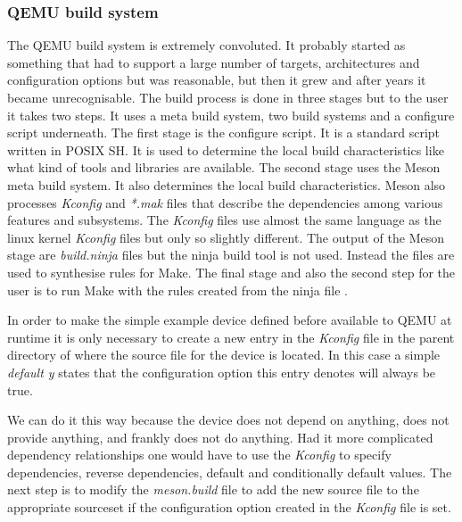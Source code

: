 \begin{codeblock}
    
\end{codeblock}

\subsubsection{QEMU build system}

The QEMU build system is extremely convoluted. It probably started as something
that had to support a large number of targets, architectures and configuration
options but was reasonable, but then it grew and after years it became
unrecognisable. The build process is done in three stages but to the user it
takes two steps. It uses a meta build system, two build systems and a configure
script underneath. The first stage is the configure script. It is a standard
script written in POSIX SH. It is used to determine the local build
characteristics like what kind of tools and libraries are available. The second
stage uses the Meson meta build system. It also determines the local build
characteristics. Meson also processes \emph{Kconfig} and \emph{*.mak} files
that describe the dependencies among various features and subsystems. The
\emph{Kconfig} files use almost the same language as the linux kernel
\emph{Kconfig} files but only so slightly different. The output of the Meson
stage are \emph{build.ninja} files but the ninja build tool is not used.
Instead the files are used to synthesise rules for Make. The final stage and
also the second step for the user is to run Make with the rules created from
the ninja file \cite{qemu2022}.

In order to make the simple example device defined before available to QEMU at
runtime it is only necessary to create a new entry in the \emph{Kconfig} file
in the parent directory of where the source file for the device is located. In
this case a simple \emph{default y} states that the configuration option this
entry denotes will always be true.

\begin{codeblock}
    
\end{codeblock}

\noindent
We can do it this way because the device does not depend on anything, does not
provide anything, and frankly does not do anything. Had it more complicated
dependency relationships one would have to use the \emph{Kconfig} to specify
dependencies, reverse dependencies, default and conditionally default values.
The next step is to modify the \emph{meson.build} file to add the new source
file to the appropriate sourceset if the configuration option created in the
\emph{Kconfig} file is set.

